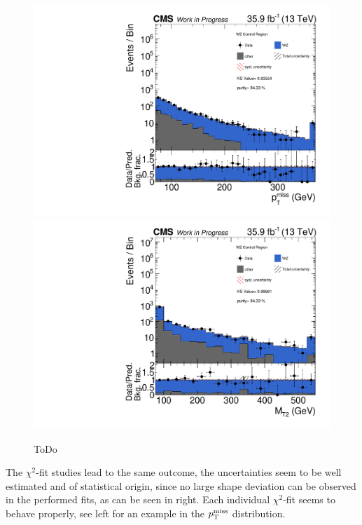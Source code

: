 \begin{figure}[htb]
 \centering
 \includegraphics[width=\pairwidth]{figures/plots_CR_wz/CRWZ_LL_nom_met_log}
 \includegraphics[width=\pairwidth]{figures/plots_CR_wz/CRWZ_LL_nom_mt2_log}
 \caption{ToDo}
 \label{fig:CRWZ}
\end{figure}
The $\chi^2$-fit studies lead to the same outcome, the uncertainties seem to be well estimated and of statistical origin, since no large shape deviation can be observed in the performed fits, as can be seen in  right. Each individual $\chi^2$-fit seems to behave properly, see  left for an example in the $p_{\mathrm{T}}^\text{miss}$ distribution.

